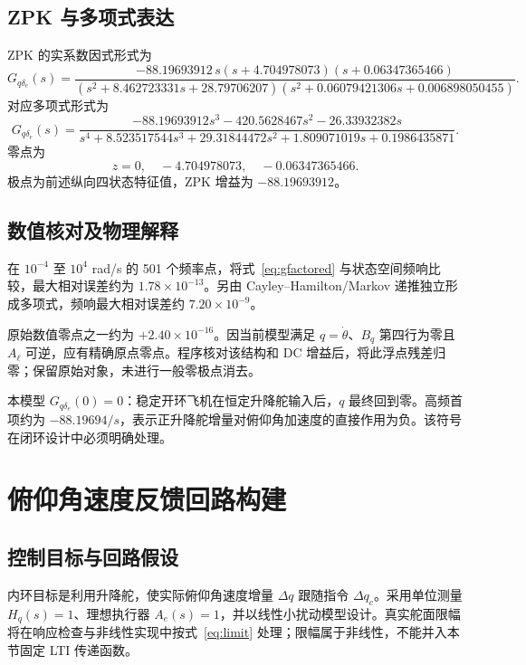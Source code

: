 \documentclass[UTF8,a4paper,11pt,fontset=windows]{ctexart}
\newcommand{\Gq}{G_{q\delta_e}}
\begin{document}
\subsection{ZPK 与多项式表达}
ZPK 的实系数因式形式为
\begin{equation}\label{eq:gfactored}
\boxed{\Gq(s)=\frac{-88.19693912\,s(s+4.704978073)(s+0.06347365466)}
{(s^2+8.462723331s+28.79706207)(s^2+0.06079421306s+0.006898050455)}.}
\end{equation}
对应多项式形式为
\begin{equation}
\Gq(s)=\frac{-88.19693912s^3-420.5628467s^2-26.33932382s}
{s^4+8.523517544s^3+29.31844472s^2+1.809071019s+0.1986435871}.
\end{equation}
零点为
\begin{equation}
z=0,\quad -4.704978073,\quad -0.06347365466.
\end{equation}
极点为前述纵向四状态特征值，ZPK 增益为 $-88.19693912$。

\subsection{数值核对及物理解释}
在 $10^{-4}$ 至 $10^4$ rad/s 的 501 个频率点，将式~\eqref{eq:gfactored} 与状态空间频响比较，最大相对误差约为 $1.78\times10^{-13}$。另由 Cayley--Hamilton/Markov 递推独立形成多项式，频响最大相对误差约 $7.20\times10^{-9}$。

原始数值零点之一约为 $+2.40\times10^{-16}$。因当前模型满足 $q=\dot\theta$、$B_q$ 第四行为零且 $A_\ell$ 可逆，应有精确原点零点。程序核对该结构和 DC 增益后，将此浮点残差归零；保留原始对象，未进行一般零极点消去。

本模型 $\Gq(0)=0$：稳定开环飞机在恒定升降舵输入后，$q$ 最终回到零。高频首项约为 $-88.19694/s$，表示正升降舵增量对俯仰角加速度的直接作用为负。该符号在闭环设计中必须明确处理。

\section{俯仰角速度反馈回路构建}\label{sec:loop}
\subsection{控制目标与回路假设}
内环目标是利用升降舵，使实际俯仰角速度增量 $\Delta q$ 跟随指令 $\Delta q_c$。采用单位测量 $H_q(s)=1$、理想执行器 $A_e(s)=1$，并以线性小扰动模型设计。真实舵面限幅将在响应检查与非线性实现中按式~\eqref{eq:limit} 处理；限幅属于非线性，不能并入本节固定 LTI 传递函数。
\end{document}
